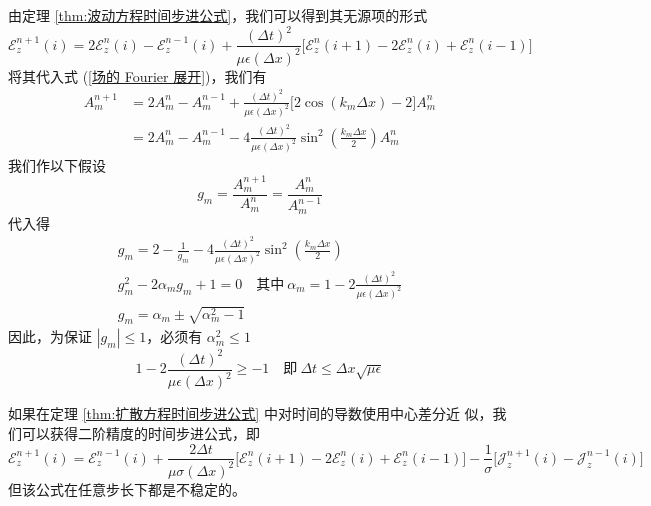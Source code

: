 \begin{solution}
    由定理 \ref{thm:波动方程时间步进公式}，我们可以得到其无源项的形式
    \begin{equation*}
        \mathscr{E}_z^{n+1}(i)=2\mathscr{E}_z^n(i)-\mathscr{E}_z^{n-1}(i)
        +\frac{(\Delta t)^2}{\mu \epsilon (\Delta x)^2}
        \Big[\mathscr{E}_z^n(i+1)-2\mathscr{E}_z^n(i)+\mathscr{E}_z^n(i-1)\Big]
    \end{equation*}
    将其代入式 (\ref{场的 Fourier 展开})，我们有
    \begin{align*}
        A_m^{n+1}&=2A_m^n-A_m^{n-1}
        +\frac{(\Delta t)^2}{\mu \epsilon (\Delta x)^2}
        \Big[2\cos (k_m \Delta x)-2]A_m^n\\
        &=2A_m^n-A_m^{n-1}
        -4\frac{(\Delta t)^2}{\mu \epsilon (\Delta x)^2}
        \sin^2\left(\frac{k_m \Delta x}{2}\right)A_m^n
    \end{align*}
    我们作以下假设
    \begin{equation*}
        g_m=\frac{A^{n+1}_m}{A^{n}_m}=\frac{A^{n}_m}{A^{n-1}_m}
    \end{equation*}
    代入得
    \begin{gather*}
        g_m=2-\frac{1}{g_m}-4\frac{(\Delta t)^2}{\mu \epsilon (\Delta x)^2}
        \sin^2\left(\frac{k_m \Delta x}{2}\right)\\
        g_m^2-2\alpha_m g_m+1=0 \quad
        \text{其中} \ \alpha_m=1-2\frac{(\Delta t)^2}{\mu \epsilon (\Delta x)^2}\\
        g_m = \alpha_m \pm \sqrt{\alpha_m^2-1}
    \end{gather*}
    因此，为保证 $|g_m|\leq 1$，必须有 $\alpha_m^2 \leq 1$
    \begin{equation*}
        1-2\frac{(\Delta t)^2}{\mu \epsilon (\Delta x)^2} \geq -1
        \quad \text{即} \ 
        \Delta t \leq \Delta x \sqrt{\mu \epsilon}
    \end{equation*}
\end{solution}

\begin{proposition}
    如果在定理 \ref{thm:扩散方程时间步进公式} 中对时间的导数使用中心差分近
    似，我们可以获得二阶精度的时间步进公式，即
    \begin{equation}
        \mathscr{E}_z^{n+1}(i)=\mathscr{E}_z^{n-1}(i)
        +\frac{2\Delta t}{\mu \sigma (\Delta x)^2}
        \Big[\mathscr{E}_z^n(i+1)-2\mathscr{E}_z^n(i)+\mathscr{E}_z^n(i-1)\Big]
        -\frac{1}{\sigma}\Big[\mathscr{J}_z^{n+1}(i)-\mathscr{J}_z^{n-1}(i)\Big]
    \end{equation}
    但该公式在任意步长下都是不稳定的。
\end{proposition}


